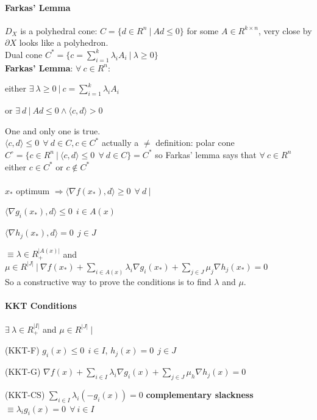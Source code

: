 \documentclass[10pt]{report}
\begin{document}
\paragraph{Farkas' Lemma} $D_X$ is a polyhedral cone: $C=\{d\in R^n\:|\:Ad\leq 0\}$ for some $A\in R^{k\times n}$, very close by $\partial X$ looks like a polyhedron.\\
Dual cone $C^*=\{c=\sum_{i=1}^k\lambda_iA_i\:|\:\lambda \geq 0\}$\\
\textbf{Farkas' Lemma}: $\forall\:c\in R^n$:
\begin{list}{}{}
	\item either $\exists\:\lambda\geq 0\:|\:c = \sum_{i=1}^k \lambda_iA_i$
	\item or $\exists\:d\:|\:Ad\leq 0\wedge\langle c,d\rangle > 0$
\end{list}
One and only one is true.\\
$\langle c,d\rangle \leq 0\:\:\forall\:d\in C, c\in C^*$ actually a $\neq$ definition: polar cone $C^\circ=\{c\in R^n\:|\:\langle c,d\rangle\leq 0\:\:\forall\:d\in C\}=C^*$ so Farkas' lemma says that $\forall\:c\in R^n$ either $c\in C^*$ or $c\not\in C^*$\\\\
$x_*$ optimum $\Rightarrow \langle\nabla f(x_*),d\rangle\geq 0\:\:\forall\:d\:|\:$
\begin{list}{}{}
	\item $\langle\nabla g_i(x_*),d\rangle\leq 0\:\:i\in A(x)$
	\item $\langle\nabla h_j(x_*),d\rangle = 0\:\:j\in J$
\end{list}
$\equiv\lambda\in R_+^{|A(x)|}$ and $\mu \in R^{|J|}\:|\:\nabla f(x_*) + \sum_{i\in A(x)}\lambda_i\nabla g_i(x_*) + \sum_{j\in J} \mu_j\nabla h_j(x_*)=0$\\
So a constructive way to prove the conditions is to find $\lambda$ and $\mu$.
\paragraph{KKT Conditions} $\exists\:\lambda\in R_+^{|I|}$ and $\mu\in R^{|J|}\:|$\begin{list}{}{}
	\item[(KKT-F)] $g_i(x)\leq 0\:\:i\in I$, $h_j(x) = 0\:\:j\in J$
	\item[(KKT-G)] $\nabla f(x) + \sum_{i\in I}\lambda_i\nabla g_i(x) + \sum_{j\in J}\mu_h\nabla h_j(x) = 0$
	\item[(KKT-CS)] $\sum_{i\in I}\lambda_i(-g_i(x)) = 0$ \textbf{complementary slackness} $\equiv \lambda_ig_i(x) = 0\:\:\forall\:i\in I$
\end{list}
\end{document}
